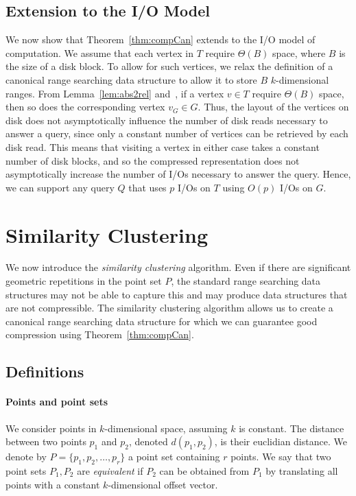 \subsection{Extension to the I/O Model}
We now show that Theorem~\ref{thm:compCan} extends to the I/O model of computation. We assume that each vertex in $T$ require $\Theta(B)$ space, where $B$ is the size of a disk block. To allow for such vertices, we relax the definition of a canonical range searching data structure to allow it to store $B$ $k$-dimensional ranges. From Lemma~\ref{lem:abs2rel} and~\cite{downey1980variations}, if a vertex $v \in T$ require $\Theta(B)$ space, then so does the corresponding vertex $v_G \in G$. Thus, the layout of the vertices on disk does not asymptotically influence the number of disk reads necessary to answer a query, since only a constant number of vertices can be retrieved by each disk read. This means that visiting a vertex in either case takes a constant number of disk blocks, and so the compressed representation does not asymptotically increase the number of I/Os necessary to answer the query. Hence, we can support any query $Q$ that uses $p$ I/Os on $T$ using $O(p)$ I/Os on $G$. 


\section{Similarity Clustering}\label{sec:clustering}
We now introduce the \emph{similarity clustering} algorithm. Even if there are significant geometric repetitions in the point set $P$, the standard range searching data structures may not be able to capture this and may produce data structures that are not compressible. The similarity clustering algorithm allows us to create a canonical range searching data structure for which we can guarantee good compression using Theorem~\ref{thm:compCan}.

\subsection{Definitions}
\paragraph{Points and point sets}
We consider points in $k$-dimensional space, assuming $k$ is constant. The distance between two points $p_1$ and $p_2$, denoted $d(p_1, p_2)$, is their euclidian distance. We denote by $P = \{ p_1, p_2, \ldots, p_r \}$ a point set containing $r$ points. We say that two point sets $P_1, P_2$ are \emph{equivalent} if $P_2$ can be obtained from $P_1$ by translating all points with a constant $k$-dimensional offset vector.

